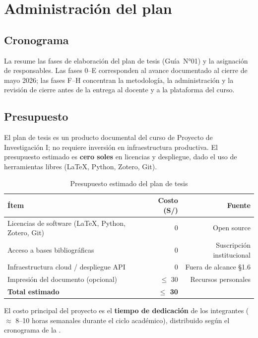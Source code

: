 \chapter{Administración del plan}
\label{cap:administracion}

\section{Cronograma}

La  resume las fases de elaboración del plan de tesis (Guía~N°01) y la
asignación de responsables. Las fases 0--E corresponden al avance documentado al cierre de mayo
2026; las fases F--H concentran la metodología, la administración y la revisión de cierre antes de
la entrega al docente y a la plataforma del curso.



\section{Presupuesto}

El plan de tesis es un producto documental del curso de Proyecto de Investigación I; no requiere
inversión en infraestructura productiva. El presupuesto estimado es \textbf{cero soles} en licencias
y despliegue, dado el uso de herramientas libres (\LaTeX{}, Python, Zotero, Git).

\begin{table}[H]
  \centering
  \caption{Presupuesto estimado del plan de tesis}
  \label{tab:presupuesto}
  \small
  \begin{tabular}{@{}p{}rr@{}}
    \toprule
    \textbf{Ítem} & \textbf{Costo (S/)} & \textbf{Fuente} \\
    \midrule
    Licencias de software (\LaTeX{}, Python, Zotero, Git) & 0 & Open source \\
    Acceso a bases bibliográficas & 0 & Suscripción institucional \\
    Infraestructura cloud / despliegue API & 0 & Fuera de alcance §1.6 \\
    Impresión del documento (opcional) & $\leq$ 30 & Recursos personales \\
    \midrule
    \textbf{Total estimado} & \textbf{$\leq$ 30} & \\
    \bottomrule
  \end{tabular}
\end{table}

El costo principal del proyecto es el \textbf{tiempo de dedicación} de los integrantes
($\approx$ 8--10 horas semanales durante el ciclo académico), distribuido según el cronograma de la
.

